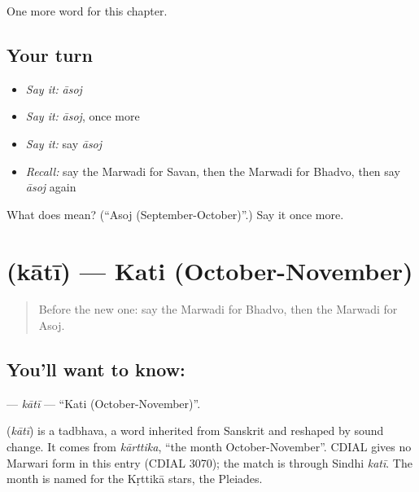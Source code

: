 \begin{grammarlens}[title={What you've built}]
One more word for this chapter.
\end{grammarlens}

\subsection*{Your turn}
\begin{itemize}
\raggedright
  \item \emph{Say it:} \emph{āsoj}
  \item \emph{Say it:} \emph{āsoj}, once more
  \item \emph{Say it:} say \emph{āsoj}
  \item \emph{Recall:} say the Marwadi for Savan, then the Marwadi for Bhadvo, then say \emph{āsoj} again
\end{itemize}

\begin{tcolorbox}[breakable,colback=teal!4,colframe=teal!35!black,title={Before you move on}]
What does  mean? (\textquotedblleft{}Asoj (September-October)\textquotedblright{}.) Say it once more.
\end{tcolorbox}
\section[\texorpdfstring{\mw{काती} (kātī)}{काती (kātī)}]{ (kātī) — Kati (October-November)}

\label{lesson:MW-C93-kati}



\begin{quote}
Before the new one: say the Marwadi for Bhadvo, then the Marwadi for Asoj.
\end{quote}

\subsection*{You'll want to know: }
\textbf{} — \emph{kātī} — \textquotedblleft{}Kati (October-November)\textquotedblright{}.

\begin{cousinweb}
\textbf{} (\emph{kātī}) is a tadbhava, a word inherited from Sanskrit and reshaped by sound change. It comes from \emph{kārttika}, \textquotedblleft{}the month October-November\textquotedblright{}. CDIAL gives no Marwari form in this entry (CDIAL 3070); the match is through Sindhi \emph{katī}. The month is named for the Kṛttikā stars, the Pleiades.
\end{cousinweb}

